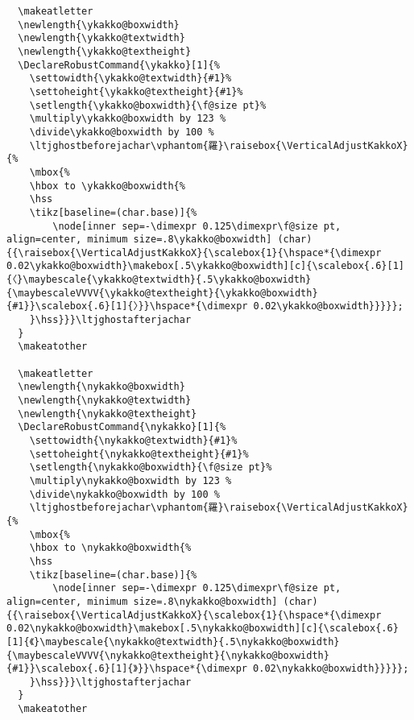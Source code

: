 \documentclass[luatex,fontsize=10pt,paper=b5,twoside]{jlreq}%
\begin{document}
\begin{lstlisting}
  \makeatletter
  \newlength{\ykakko@boxwidth}
  \newlength{\ykakko@textwidth}
  \newlength{\ykakko@textheight}
  \DeclareRobustCommand{\ykakko}[1]{%
    \settowidth{\ykakko@textwidth}{#1}%
    \settoheight{\ykakko@textheight}{#1}%
    \setlength{\ykakko@boxwidth}{\f@size pt}%
    \multiply\ykakko@boxwidth by 123 %
    \divide\ykakko@boxwidth by 100 %
    \ltjghostbeforejachar\vphantom{羅}\raisebox{\VerticalAdjustKakkoX}{%
    \mbox{%
    \hbox to \ykakko@boxwidth{%
    \hss
    \tikz[baseline=(char.base)]{%
        \node[inner sep=-\dimexpr 0.125\dimexpr\f@size pt, align=center, minimum size=.8\ykakko@boxwidth] (char) {{\raisebox{\VerticalAdjustKakkoX}{\scalebox{1}{\hspace*{\dimexpr 0.02\ykakko@boxwidth}\makebox[.5\ykakko@boxwidth][c]{\scalebox{.6}[1]{〈}\maybescale{\ykakko@textwidth}{.5\ykakko@boxwidth}{\maybescaleVVVV{\ykakko@textheight}{\ykakko@boxwidth}{#1}}\scalebox{.6}[1]{〉}}\hspace*{\dimexpr 0.02\ykakko@boxwidth}}}}};
    }\hss}}}\ltjghostafterjachar
  }
  \makeatother

  \makeatletter
  \newlength{\nykakko@boxwidth}
  \newlength{\nykakko@textwidth}
  \newlength{\nykakko@textheight}
  \DeclareRobustCommand{\nykakko}[1]{%
    \settowidth{\nykakko@textwidth}{#1}%
    \settoheight{\nykakko@textheight}{#1}%
    \setlength{\nykakko@boxwidth}{\f@size pt}%
    \multiply\nykakko@boxwidth by 123 %
    \divide\nykakko@boxwidth by 100 %
    \ltjghostbeforejachar\vphantom{羅}\raisebox{\VerticalAdjustKakkoX}{%
    \mbox{%
    \hbox to \nykakko@boxwidth{%
    \hss
    \tikz[baseline=(char.base)]{%
        \node[inner sep=-\dimexpr 0.125\dimexpr\f@size pt, align=center, minimum size=.8\nykakko@boxwidth] (char) {{\raisebox{\VerticalAdjustKakkoX}{\scalebox{1}{\hspace*{\dimexpr 0.02\nykakko@boxwidth}\makebox[.5\nykakko@boxwidth][c]{\scalebox{.6}[1]{《}\maybescale{\nykakko@textwidth}{.5\nykakko@boxwidth}{\maybescaleVVVV{\nykakko@textheight}{\nykakko@boxwidth}{#1}}\scalebox{.6}[1]{》}}\hspace*{\dimexpr 0.02\nykakko@boxwidth}}}}};
    }\hss}}}\ltjghostafterjachar
  }
  \makeatother


\end{lstlisting}
\end{document}
